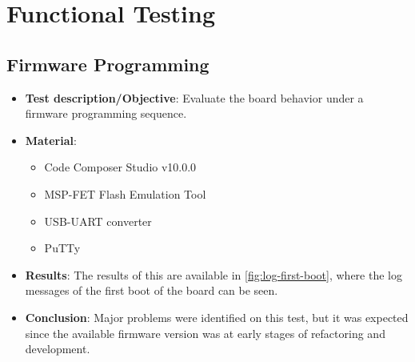  \newpage

\section{Functional Testing}

\subsection{Firmware Programming}

\begin{itemize}
    \item \textbf{Test description/Objective}: Evaluate the board behavior under a firmware programming sequence.
    \item \textbf{Material}:
        \begin{itemize}
            \item Code Composer Studio v10.0.0
            \item MSP-FET Flash Emulation Tool
            \item USB-UART converter
            \item PuTTy
        \end{itemize}
    \item \textbf{Results}: The results of this are available in \autoref{fig:log-first-boot}, where the log messages of the first boot of the board can be seen.
    \item \textbf{Conclusion}: Major problems were identified on this test, but it was expected since the available firmware version was at early stages of refactoring and development.
\end{itemize}

